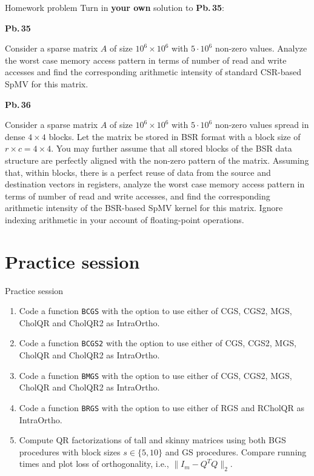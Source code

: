 \documentclass[t,usepdftitle=false]{beamer}
\begin{document}
\begin{frame}{Homework problem}\vspace{.1cm}
Turn in \textbf{your own} solution to \textbf{Pb.$\,$35}:\vspace{.15cm}\\
\begin{minipage}[t]{0.1\textwidth}
\textbf{Pb.$\,$35}
\end{minipage}
\begin{minipage}[t]{0.89\textwidth}
Consider a sparse matrix $A$ of size $10^6\times 10^6$ with $5\cdot 10^6$ non-zero values.
Analyze the worst case memory access pattern in terms of number of read and write accesses and find the corresponding arithmetic intensity of standard CSR-based SpMV for this matrix.
\end{minipage}\vspace{.15cm}
\begin{minipage}[t]{0.1\textwidth}
\textbf{Pb.$\,$36}
\end{minipage}
\begin{minipage}[t]{0.89\textwidth}
Consider a sparse matrix $A$ of size $10^6\times 10^6$ with $5\cdot 10^6$ non-zero values spread in dense $4\times 4$ blocks.
Let the matrix be stored in BSR format with a block size of $r\times c=4\times 4$.
You may further assume that all stored blocks of the BSR data structure are perfectly aligned with the non-zero pattern of the matrix.
Assuming that, within blocks, there is a perfect reuse of data from the source and destination vectors in registers, analyze the worst case memory access pattern in terms of number of read and write accesses, and find the corresponding arithmetic intensity of the BSR-based SpMV kernel for this matrix.
Ignore indexing arithmetic in your account of floating-point operations.
\end{minipage}
\end{frame}

\section{Practice session}

\begin{frame}[fragile]{Practice session}
\begin{enumerate}
\item Code a function \texttt{BCGS} with the option to use either of CGS, CGS2, MGS, CholQR and CholQR2 as IntraOrtho. 
\item Code a function \texttt{BCGS2} with the option to use either of CGS, CGS2, MGS, CholQR and CholQR2 as IntraOrtho. 
\item Code a function \texttt{BMGS} with the option to use either of CGS, CGS2, MGS, CholQR and CholQR2 as IntraOrtho. 
\item Code a function \texttt{BRGS} with the option to use either of RGS and RCholQR as IntraOrtho. 
\item Compute QR factorizations of tall and skinny matrices using both BGS procedures with block sizes $s\in\{5,10\}$ and GS procedures.
Compare running times and plot loss of orthogonality, i.e., $\|I_m-Q^TQ\|_2$.
\end{enumerate}
\end{frame}
\end{document}
